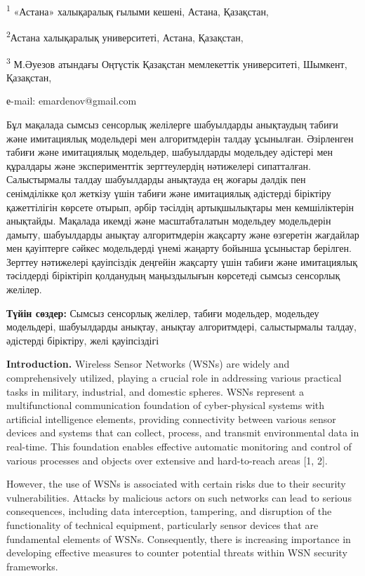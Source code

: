 \textsuperscript{1} «Астана» халықаралық ғылыми кешені, Астана,
Қазақстан,

\textsuperscript{2}Астана халықаралық университеті, Астана, Қазақстан,

\textsuperscript{3} М.Әуезов атындағы Оңтүстік Қазақстан мемлекеттік
университеті, Шымкент, Қазақстан,

е-mail: emardenov@gmail.com

Бұл мақалада сымсыз сенсорлық желілерге шабуылдарды анықтаудың табиғи
және имитациялық модельдері мен алгоритмдерін талдау ұсынылған.
Әзірленген табиғи және имитациялық модельдер, шабуылдарды модельдеу
әдістері мен құралдары және эксперименттік зерттеулердің нәтижелері
сипатталған. Салыстырмалы талдау шабуылдарды анықтауда ең жоғары дәлдік
пен сенімділікке қол жеткізу үшін табиғи және имитациялық әдістерді
біріктіру қажеттілігін көрсете отырып, әрбір тәсілдің артықшылықтары мен
кемшіліктерін анықтайды. Мақалада икемді және масштабталатын модельдеу
модельдерін дамыту, шабуылдарды анықтау алгоритмдерін жақсарту және
өзгеретін жағдайлар мен қауіптерге сәйкес модельдерді үнемі жаңарту
бойынша ұсыныстар берілген. Зерттеу нәтижелері қауіпсіздік деңгейін
жақсарту үшін табиғи және имитациялық тәсілдерді біріктіріп қолданудың
маңыздылығын көрсетеді сымсыз сенсорлық желілер.

{\bfseries Түйін сөздер:} Сымсыз сенсорлық желілер, табиғи модельдер,
модельдеу модельдері, шабуылдарды анықтау, анықтау алгоритмдері,
салыстырмалы талдау, әдістерді біріктіру, желі қауіпсіздігі

{\bfseries Introduction.} Wireless Sensor Networks (WSNs) are widely and
comprehensively utilized, playing a crucial role in addressing various
practical tasks in military, industrial, and domestic spheres. WSNs
represent a multifunctional communication foundation of cyber-physical
systems with artificial intelligence elements, providing connectivity
between various sensor devices and systems that can collect, process,
and transmit environmental data in real-time. This foundation enables
effective automatic monitoring and control of various processes and
objects over extensive and hard-to-reach areas {[}1, 2{]}.

However, the use of WSNs is associated with certain risks due to their
security vulnerabilities. Attacks by malicious actors on such networks
can lead to serious consequences, including data interception,
tampering, and disruption of the functionality of technical equipment,
particularly sensor devices that are fundamental elements of WSNs.
Consequently, there is increasing importance in developing effective
measures to counter potential threats within WSN security frameworks.

